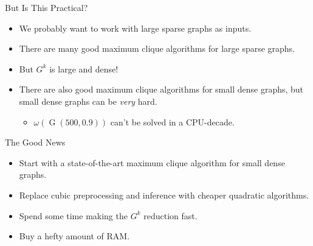 \documentclass{beamer}
\begin{document}
\begin{frame}{But Is This Practical?}
    \begin{itemize}
        \item We probably want to work with large sparse graphs as inputs.
        \item There are many good maximum clique algorithms for large sparse graphs.
        \item But $G^k$ is large and dense!
        \item There are also good maximum clique algorithms for small dense graphs, but small dense
            graphs can be \emph{very} hard.
            \begin{itemize}
                \item $\omega(\operatorname{G}(500, 0.9))$ can't be solved in a CPU-decade.
            \end{itemize}
    \end{itemize}
\end{frame}

\begin{frame}{The Good News}
    \begin{itemize}
        \item Start with a state-of-the-art maximum clique algorithm for small dense graphs.
        \item Replace cubic preprocessing and inference with cheaper quadratic algorithms.
        \item Spend some time making the $G^k$ reduction fast.
        \item Buy a hefty amount of RAM.
    \end{itemize}
\end{frame}
\end{document}
